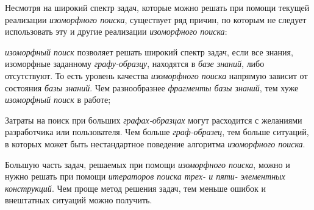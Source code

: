 \begin{SCn}
\begin{scnsubstruct}
\begin{scnsubstruct}
\begin{scnsubstruct}
\begin{scnsubstruct}
\begin{scnsubstruct}
\begin{scnsubstruct}
\begin{scnsubstruct}
\begin{scnsubstruct}
{			Несмотря на широкий спектр задач, которые можно решать при помощи текущей реализации \textit{изоморфного поиска}, существует ряд причин, по которым не следует использовать эту и другие реализации \textit{изоморфного поиска}:
			\begin{scnitemize}
				\item \textit{изоморфный поиск} позволяет решать широкий спектр задач, если все знания, изоморфные заданному \textit{графу-образцу}, находятся в \textit{базе знаний}, либо отсутствуют. То есть уровень качества \textit{изоморфного поиска} напрямую зависит от состояния \textit{базы знаний}. Чем разнообразнее \textit{фрагменты базы знаний}, тем хуже \textit{изоморфный поиск} в работе;
				\item Затраты на поиск при больших \textit{графах-образцах} могут расходится с желаниями разработчика или пользователя. Чем больше \textit{граф-образец}, тем больше ситуаций, в которых может быть нестандартное поведение алгоритма \textit{изоморфного поиска}.
				\item Большую часть задач, решаемых при помощи \textit{изоморфного поиска}, можно и нужно решать при помощи \textit{итераторов поиска трех- и пяти- элементных конструкций}. Чем проще метод решения задач, тем меньше ошибок и внештатных ситуаций можно получить.
			\end{scnitemize}
		}
		\end{scnsubstruct}
	\end{scnsubstruct}

	\end{scnsubstruct}

	\end{scnsubstruct}
	

\end{scnsubstruct}
\end{scnsubstruct}
\end{scnsubstruct}
\end{scnsubstruct}
\end{SCn}
